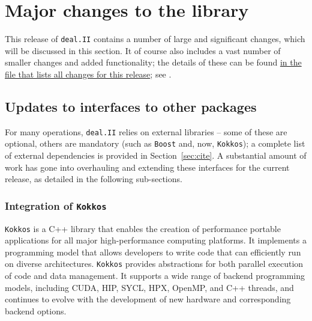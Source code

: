\documentclass{ansarticle-preprint}
\newcommand{\specialword}[1]{\texttt{#1}}
\newcommand{\dealii}{{\specialword{deal.II}}\xspace}
\newcommand{\boost}{{\specialword{Boost}}\xspace}
\newcommand{\kokkos}{{\specialword{Kokkos}}\xspace}
\begin{document}
\section{Major changes to the library}
\label{sec:major}

This release of \dealii contains a number of large and significant changes,
which will be discussed in this section.
It of course also includes a
vast number of smaller changes and added functionality; the details of these
can be found
\href{https://dealii.org/developer/doxygen/deal.II/changes_between_9_4_2_and_9_5_0.html}
{in the file that lists all changes for this release}; see \cite{changes95}.


\subsection{Updates to interfaces to other packages}\label{sec:external}

For many operations, \dealii{} relies on external libraries -- some of
these are optional, others are mandatory (such as \boost and, now,
\kokkos); a complete list of external dependencies is provided in
Section~\ref{sec:cite}. A substantial amount of work has gone into
overhauling and extending these interfaces for the current release, as
detailed in the following sub-sections.

\subsubsection{Integration of \kokkos}\label{sec:kokkos}

\kokkos \cite{trott2022} is a C++ library that enables the creation of
performance portable applications for all major high-performance computing
platforms. It implements a programming model that allows developers to write
code that can efficiently run on diverse architectures. \kokkos provides
abstractions for both parallel execution of code and data management. It
supports a wide range of backend programming models, including CUDA, HIP, SYCL,
HPX, OpenMP, and C++ threads, and continues to evolve with the development of
new hardware and corresponding backend options.
\end{document}
